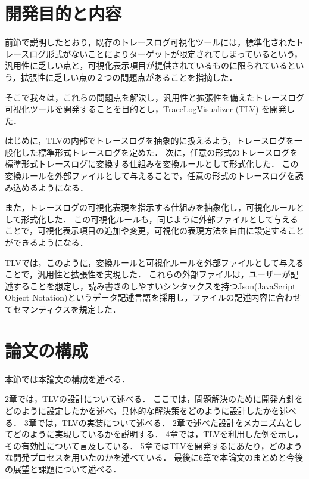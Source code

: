 \section{開発目的と内容}

前節で説明したとおり，既存のトレースログ可視化ツールには，標準化されたトレースログ形式がないことによりターゲットが限定されてしまっているという，汎用性に乏しい点と，可視化表示項目が提供されているものに限られているという，拡張性に乏しい点の２つの問題点があることを指摘した．

そこで我々は，これらの問題点を解決し，汎用性と拡張性を備えたトレースログ可視化ツールを開発することを目的とし，TraceLogVisualizer (TLV) を開発した．

はじめに，TLVの内部でトレースログを抽象的に扱えるよう，トレースログを一般化した標準形式トレースログを定めた．
次に，任意の形式のトレースログを標準形式トレースログに変換する仕組みを変換ルールとして形式化した．
この変換ルールを外部ファイルとして与えることで，任意の形式のトレースログを読み込めるようになる．

また，トレースログの可視化表現を指示する仕組みを抽象化し，可視化ルールとして形式化した．
この可視化ルールも，同じように外部ファイルとして与えることで，可視化表示項目の追加や変更，可視化の表現方法を自由に設定することができるようになる．

TLVでは，このように，変換ルールと可視化ルールを外部ファイルとして与えることで，汎用性と拡張性を実現した．
これらの外部ファイルは，ユーザーが記述することを想定し，読み書きのしやすいシンタックスを持つJson(JavaScript Object Notation)\cite{Json}というデータ記述言語を採用し，ファイルの記述内容に合わせてセマンティクスを規定した．


\section{論文の構成}
本節では本論文の構成を述べる．

2章では，TLVの設計について述べる．
ここでは，問題解決のために開発方針をどのように設定したかを述べ，具体的な解決策をどのように設計したかを述べる．
3章では，TLVの実装について述べる．
2章で述べた設計をメカニズムとしてどのように実現しているかを説明する．
4章では，TLVを利用した例を示し，その有効性について言及している．
5章ではTLVを開発するにあたり，どのような開発プロセスを用いたのかを述べている．
最後に6章で本論文のまとめと今後の展望と課題について述べる．